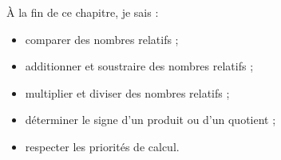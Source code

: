 
\begin{objectifs}
À la fin de ce chapitre, je sais :

\begin{itemize}
    \item comparer des nombres relatifs ;
    \item additionner et soustraire des nombres relatifs ;
    \item multiplier et diviser des nombres relatifs ;
    \item déterminer le signe d'un produit ou d'un quotient ;
    \item respecter les priorités de calcul.
\end{itemize}
\end{objectifs}

